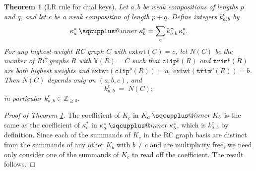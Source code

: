 \documentclass{amsart}
\makeatletter
\newcommand{\sqcupplus@inner}[2]{%
  \vcenter{\hbox{\ooalign{%
    \hfil$\m@th#1\sqcup$\hfil\cr
    \hfil\raisebox{0.15ex}{$\m@th#1\scriptscriptstyle+$}\hfil\cr
  }}}%
}
\newcommand{\sqcupplus}{\mathbin{\mathpalette\sqcupplus@inner\relax}}
\newtheorem{theorem}{Theorem}[section]
\theoremstyle{definition}
\theoremstyle{remark}
\numberwithin{equation}{subsection}
\newcommand{\trm}{\mathtt{trim}}
\newcommand{\clp}{\mathtt{clip}}
\makeatother
\begin{document}
\begin{theorem}[LR rule for dual keys]\label{theorem:LRkey}
Let $a,b$ be weak compositions of lengths $p$ and $q$, and let $c$ be a weak composition of length $p+q$. Define integers $k_{a,b}^c$ by
$$\kappa_a^* \sqcupplus \kappa_b^* = \sum_{c} k_{a,b}^c\,\kappa_c^*.$$
For any highest-weight RC graph $C$ with $\mathrm{extwt}(C)=c$, let $N(C)$ be the number of RC graphs $R$ with $\mathbb{Y}(R)=C$ such that $\clp^p(R)$ and $\trm^p(R)$ are both highest weights and $\mathrm{extwt}(\clp^p(R)) = a$, $\mathrm{extwt}(\trm^p(R)) = b$. Then $N(C)$ depends only on $(a,b,c)$, and
$$k_{a,b}^c \;=\; N(C);$$
in particular $k_{a,b}^c\in\mathbb{Z}_{\geq 0}$.
\end{theorem}

\begin{proof}[Proof of Theorem \ref{theorem:LRkey}]
  The coefficient of $K_c$ in $K_a\sqcupplus K_b$ is the same as the coefficient of $\kappa_c^*$ in $\kappa_a^*\sqcupplus\kappa_b^*$, which is $k_{a,b}^c$ by definition. Since each of the summands of $K_c$ in the RC graph basis are distinct from the summands of any other $K_b$ with $b\neq c$ and are multiplicity free, we need only consider one of the summands of $K_c$ to read off the coefficient. The result follows.
\end{proof}
\end{document}
